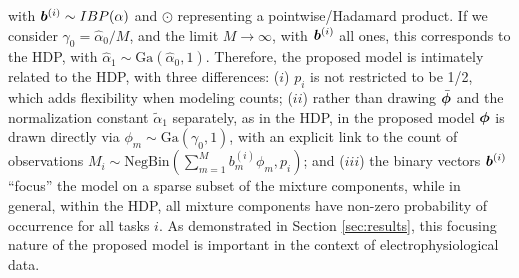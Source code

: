 \documentclass[journal]{IEEEtran}
\begin{document}
with $\boldsymbol{b}^{(i)}\sim\relax{IBP}(\alpha)$ and $\odot$ representing a pointwise/Hadamard product. If we consider $\gamma_0=\hat{\alpha}_0/M$, and the limit $M\rightarrow\infty$, with $\boldsymbol{b}^{(i)}$ all ones, this corresponds to the HDP, with $\hat{\alpha}_1\sim\mbox{Ga}(\hat{\alpha}_0,1)$. Therefore, the proposed model is intimately related to the HDP, with three differences: ($i$) $p_i$ is not restricted to be 1/2, which adds flexibility when modeling counts; ($ii$) rather than drawing $\bar{\boldsymbol{\phi}}$ and the normalization constant $\tilde{\alpha}_1$ separately, as in the HDP, in the proposed model $\boldsymbol{\phi}$ is drawn directly via $\phi_m\sim\mbox{Ga}(\gamma_0,1)$, with an explicit link to the count of observations $M_i\sim\mbox{NegBin}(\sum_{m=1}^Mb_m^{(i)}\phi_m,p_i)$; and ($iii$) the binary vectors $\boldsymbol{b}^{(i)}$ ``focus'' the model on a sparse subset of the mixture components, while in general, within the HDP, all mixture components have non-zero probability of occurrence for all tasks $i$. As demonstrated in Section \ref{sec:results}, this focusing nature of the proposed model is important in the context of electrophysiological data.

\end{document}
